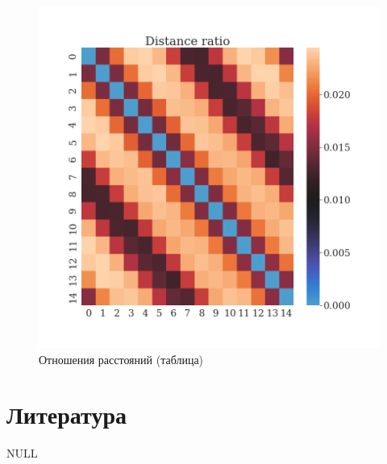 \documentclass[a4paper,14pt]{article}
\theoremstyle{plain} %
\theoremstyle{definition} %
\theoremstyle{remark} %
\begin{document}
	\begin{figure}[bhtp]
		\centering
		\includegraphics[width=\linewidth]{../dist_ratio_table.png}
		\caption{Отношения расстояний (таблица)}
		\label{fig:dist_ratio_table}
	\end{figure}

	\section{Литература}
	NULL
\end{document}
